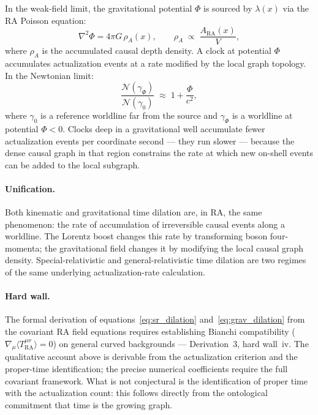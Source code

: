 \documentclass[11pt,a4paper]{article}
\theoremstyle{plain}
\theoremstyle{definition}
\theoremstyle{remark}
\begin{document}
In the weak-field limit, the gravitational potential $\Phi$ is sourced by
$\lambda(x)$ via the RA Poisson equation:
\begin{equation}
  \nabla^2\Phi = 4\pi G\,\rho_A(x),
  \qquad
  \rho_A \;\propto\; \frac{A_{\mathrm{RA}}(x)}{V},
  \label{eq:poisson_grav_dilation}
\end{equation}
where $\rho_A$ is the accumulated causal depth density. A clock at potential
$\Phi$ accumulates actualization events at a rate modified by the local graph
topology. In the Newtonian limit:
\begin{equation}
  \frac{\mathcal{N}(\gamma_{\Phi})}{\mathcal{N}(\gamma_0)}
  \;\approx\; 1 + \frac{\Phi}{c^2},
  \label{eq:grav_dilation}
\end{equation}
where $\gamma_0$ is a reference worldline far from the source and $\gamma_\Phi$
is a worldline at potential $\Phi < 0$. Clocks deep in a gravitational well
accumulate fewer actualization events per coordinate second --- they run slower
--- because the dense causal graph in that region constrains the rate at which
new on-shell events can be added to the local subgraph.

\paragraph{Unification.}
Both kinematic and gravitational time dilation are, in RA, the same phenomenon:
the rate of accumulation of irreversible causal events along a worldline. The
Lorentz boost changes this rate by transforming boson four-momenta; the
gravitational field changes it by modifying the local causal graph density.
Special-relativistic and general-relativistic time dilation are two regimes of
the same underlying actualization-rate calculation.

\paragraph{Hard wall.}
The formal derivation of equations~\eqref{eq:sr_dilation}
and~\eqref{eq:grav_dilation} from the covariant RA field equations requires
establishing Bianchi compatibility ($\nabla_\mu \langle T^{\mu\nu}_{\mathrm{RA}}
\rangle = 0$) on general curved backgrounds --- Derivation~3, hard wall~iv.
The qualitative account above is derivable from the actualization criterion and
the proper-time identification; the precise numerical coefficients require the
full covariant framework. What is not conjectural is the identification of proper
time with the actualization count: this follows directly from the ontological
commitment that time is the growing graph.
\end{document}
